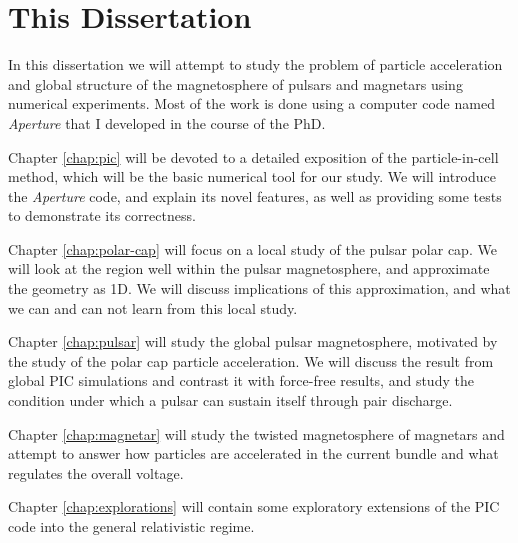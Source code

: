 \section{This Dissertation}
\label{sec:intro-outline}

In this dissertation we will attempt to study the problem of particle
acceleration and global structure of the magnetosphere of pulsars and
magnetars using numerical experiments. Most of the work is done using a computer
code named {\it Aperture} that I developed in the course of the PhD.

Chapter \ref{chap:pic} will be devoted to a detailed exposition of the
particle-in-cell method, which will be the basic numerical tool for our study.
We will introduce the {\it Aperture} code, and explain its novel features, as
well as providing some tests to demonstrate its correctness.

Chapter \ref{chap:polar-cap} will focus on a local study of the pulsar
polar cap. We will look at the region well within the pulsar magnetosphere, and
approximate the geometry as 1D. We will discuss implications of this
approximation, and what we can and can not learn from this local study.

Chapter \ref{chap:pulsar} will study the global pulsar magnetosphere, motivated
by the study of the polar cap particle acceleration. We will discuss the
result from global PIC simulations and contrast it with force-free results, and
study the condition under which a pulsar can sustain itself through pair discharge.

Chapter \ref{chap:magnetar} will study the twisted magnetosphere of magnetars
and attempt to answer how particles are accelerated in the current bundle and
what regulates the overall voltage.

Chapter \ref{chap:explorations} will contain some exploratory extensions of the
PIC code into the general relativistic regime.

